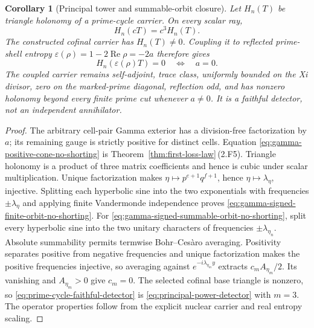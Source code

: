 \documentclass[11pt]{article}
\newtheorem{corollary}[theorem]{Corollary}
\theoremstyle{definition}
\theoremstyle{remark}
\newcommand{\Rea}{\operatorname{Re}}
\begin{document}
\begin{corollary}[Principal tower and summable-orbit closure]
Let \(H_n(T)\) be triangle holonomy of a prime-cycle carrier.  On every
scalar ray,
\[
                         H_n(cT)=c^3H_n(T).
\tag{7.6U}\label{eq:prime-cycle-cubic-ray}
\]
The constructed cofinal carrier has \(H_n(T)\ne0\).  Coupling it to reflected
prime-shell entropy
\(\varepsilon(\rho)=1-2\Rea\rho=-2a\) therefore gives
\[
 H_n\!\left(\varepsilon(\rho)T\right)=0
 \quad\Longleftrightarrow\quad a=0.
\tag{7.6V}\label{eq:prime-cycle-faithful-detector}
\]
The coupled carrier remains self-adjoint, trace class, uniformly bounded on
the Xi divisor, zero on the marked-prime diagonal, reflection odd, and has
nonzero holonomy beyond every finite prime cut whenever \(a\ne0\).  It is a
faithful detector, not an independent annihilator.
\end{corollary}

\begin{proof}
The arbitrary cell-pair Gamma exterior has a division-free factorization by
\(a\); its remaining gauge is strictly positive for distinct cells.
Equation \eqref{eq:gamma-positive-cone-no-shorting} is
Theorem~\ref{thm:first-loss-law}\,(2.F5).  Triangle holonomy is a product of
three matrix coefficients and hence is cubic under scalar multiplication.
Unique factorization makes \(\eta\mapsto p^{e+1}q^{f+1}\), hence
\(\eta\mapsto\lambda_\eta\), injective.  Splitting each hyperbolic sine into
the two exponentials with frequencies \(\pm\lambda_\eta\) and applying
finite Vandermonde independence proves
\eqref{eq:gamma-signed-finite-orbit-no-shorting}.
For \eqref{eq:gamma-signed-summable-orbit-no-shorting}, split every
hyperbolic sine into the two unitary characters of frequencies
\(\pm\lambda_{\eta_n}\).  Absolute summability permits termwise
Bohr--Ces\`aro averaging.  Positivity separates positive from negative
frequencies and unique factorization makes the positive frequencies
injective, so averaging against \(e^{-i\lambda_{\eta_m}y}\) extracts
\(c_mA_{\eta_m}/2\).  Its vanishing and \(A_{\eta_m}>0\) give \(c_m=0\).
The selected cofinal base triangle is nonzero, so
\eqref{eq:prime-cycle-faithful-detector} is
\eqref{eq:principal-power-detector} with \(m=3\).  The operator properties
follow from the explicit nuclear carrier and real entropy scaling.
\end{proof}
\end{document}

